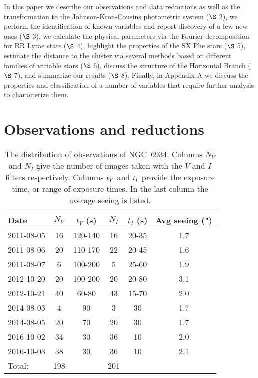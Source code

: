 \documentclass[journal]{rmaa}
\newcommand{\1}{\'{\i}}
\begin{document}
In this paper we describe our observations and data reductions as well as the
transformation to the Johnson-Kron-Cousins photometric system ($\S$ 2), we perform the
identification of known variables and report discovery of a few new ones ($\S$ 3), we
calculate the physical parameters via the Fourier decomposition for RR Lyrae stars
($\S$ 4), highlight the properties of the SX Phe stars ($\S$ 5), estimate the
distance to the cluster via several methods based on different families of variable
stars ($\S$ 6), discuss the structure of the Horizontal Branch ($\S$ 7), and
summarize our results ($\S$ 8). Finally, in Appendix A we discuss the properties and
classification of a number of variables that require further analysis to
characterize them.


\section{Observations and reductions}
\label{sec:ObserRed}


\begin{table}[t]
\footnotesize
\caption{The distribution of observations of NGC~6934.
Columns $N_{V}$ and $N_{I}$ give the number of images taken with the $V$ and $I$
filters respectively. Columns $\MakeLowercase{t}_{V}$ and $\MakeLowercase{t}_{I}$
provide the exposure time,
or range of exposure times. In the last column the average seeing is listed.}
\centering
\begin{tabular}{lccccc}
\hline
Date  &  $N_{V}$ & $t_{V}$ (s) & $N_{I}$ &$t_{I}$ (s)&Avg seeing (") \\
\hline
 2011-08-05 & 16 & 120-140 & 16 & 20-35   & 1.7\\
 2011-08-06 & 20 & 110-170 & 22 & 20-45  & 1.6\\
 2011-08-07 &  6 & 100-200 &  5 & 25-60  & 1.9\\
 2012-10-20 & 20 & 100-200 & 20 & 20-80 & 3.1\\
 2012-10-21 & 40 & 60-80 & 43 & 15-70 & 2.0\\
 2014-08-03 &  4 & 90 &  3 & 30 & 1.7\\
 2014-08-05 & 20 & 70 & 20 & 30 & 1.7\\
 2016-10-02 & 34 & 30  & 36 & 10 & 2.0\\
 2016-10-03 & 38 & 30 & 36 & 10 & 2.1\\
\hline
Total:   & 198&    &  201  &    &\\
\hline
\end{tabular}
\label{tab:observations}
\end{table}
\end{document}

